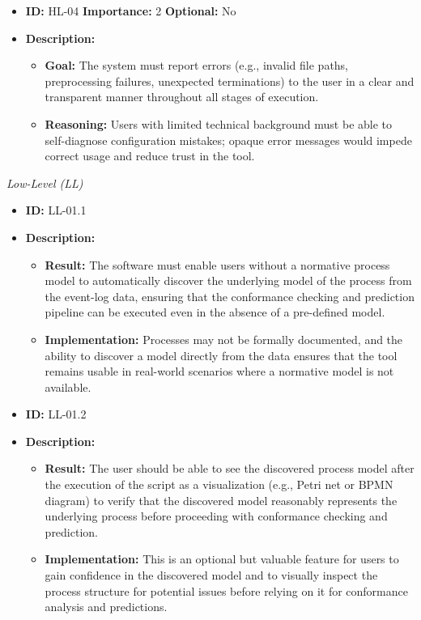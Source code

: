 \documentclass[12pt,a4paper]{article}
\begin{document}
\begin{itemize}
    \item \textbf{ID:} HL-04
 \textbf{Importance:} 2
 \textbf{Optional:} No
    \item \textbf{Description:}
    \begin{itemize}
        \item \textbf{Goal:} The system must report errors (e.g., invalid file paths, preprocessing failures, unexpected terminations) to the user in a clear and transparent manner throughout all stages of execution.
        \item \textbf{Reasoning:} Users with limited technical background must be able to self-diagnose configuration mistakes; opaque error messages would impede correct usage and reduce trust in the tool.
    \end{itemize}
\end{itemize}
\vspace{1.5em}

\noindent \textit{Low-Level (LL)}

\begin{itemize}
    \item \textbf{ID:} LL-01.1
    \item \textbf{Description:}
    \begin{itemize}
        \item \textbf{Result:} The software must enable users without a normative process model to automatically discover the underlying model of the process from the event-log data, ensuring that the conformance checking and prediction pipeline can be executed even in the absence of a pre-defined model.
        \item \textbf{Implementation:} Processes may not be formally documented, and the ability to discover a model directly from the data ensures that the tool remains usable in real-world scenarios where a normative model is not available.
    \end{itemize}
\end{itemize}
\vspace{1.5em}
\begin{itemize}
    \item \textbf{ID:} LL-01.2
    \item \textbf{Description:}
    \begin{itemize}
        \item \textbf{Result:} The user should be able to see the discovered process model after the execution of the script as a visualization (e.g., Petri net or BPMN diagram) to verify that the discovered model reasonably represents the underlying process before proceeding with conformance checking and prediction.
        \item \textbf{Implementation:} This is an optional but valuable feature for users to gain confidence in the discovered model and to visually inspect the process structure for potential issues before relying on it for conformance analysis and predictions.
    \end{itemize}
\end{itemize}
\vspace{1.5em}
\end{document}
